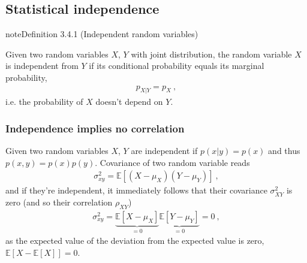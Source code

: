 \documentclass[letterpaper,10pt,english]{jupyterBook}
\begin{document}
\subsection{Statistical independence}
\label{\detokenize{ch/prob/rv-multi-dimensional:statistical-independence}}\label{\detokenize{ch/prob/rv-multi-dimensional:prob-multidim-independence}}\label{ch/prob/rv-multi-dimensional:definition-2}
\begin{sphinxadmonition}{note}{Definition 3.4.1 (Independent random variables)}



\sphinxAtStartPar
Given two random variables \(X\), \(Y\) with joint distribution, the random variable \(X\) is independent from \(Y\) if its conditional probability equals its marginal probability,
\begin{equation*}
\begin{split}p_{X|Y} = p_X \ ,\end{split}
\end{equation*}
\sphinxAtStartPar
i.e. the probability of \(X\) doesn’t depend on \(Y\).
\end{sphinxadmonition}


\subsubsection{Independence implies no correlation}
\label{\detokenize{ch/prob/rv-multi-dimensional:independence-implies-no-correlation}}\label{\detokenize{ch/prob/rv-multi-dimensional:prob-multidim-independence-no-correlation}}
\sphinxAtStartPar
Given two random variables \(X\), \(Y\) are independent if \(p(x|y) = p(x)\) and thus \(p(x,y) = p(x) p(y)\). Covariance of two random variable reads
\begin{equation*}
\begin{split}\sigma^2_{xy} = \mathbb{E} \left[ (X - \mu_X) (Y - \mu_Y)  \right] \ ,\end{split}
\end{equation*}
\sphinxAtStartPar
and if they’re independent, it immediately follows that their covariance \(\sigma^2_{XY}\) is zero (and so their correlation \(\rho_{XY}\))
\begin{equation*}
\begin{split}\sigma^2_{xy} = \underbrace{\mathbb{E} \left[ X - \mu_X \right]}_{=0} \underbrace{\mathbb{E} \left[ Y - \mu_Y \right]}_{=0} = 0 \ ,\end{split}
\end{equation*}
\sphinxAtStartPar
as the expected value of the deviation from the expected value is zero, \(\mathbb{E} \left[ X - \mathbb{E}[X] \right] = 0\).
\end{document}
